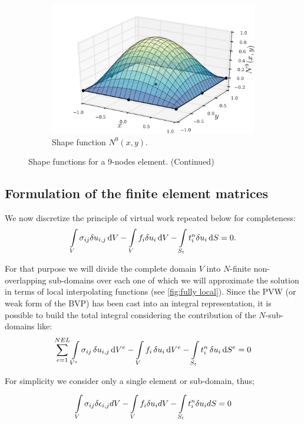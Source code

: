 \begin{figure} [H]
\begin{subfigure}[b]{0.45\textwidth}
		\includegraphics[width=\textwidth]{shape_func-9-nodes-9.pdf}
		\caption{Shape function $N^9(x,y)$.}
	\end{subfigure}
\caption{Shape functions for a 9-nodes element. (Continued)}
\end{figure}

\subsection{Formulation of the finite element matrices}
We now discretize the principle of virtual work repeated below for completeness:
\begin{equation} \label{pvw_2}
\int\limits_V \sigma_{ij} \delta u_{i,j} \dd{V} - \int\limits_V f_i \delta u_i \dd{V} - \int\limits_{S_t} t_i^n \delta u_i \dd{S} = 0.
\end{equation}

For that purpose we will divide the complete domain $V$ into $N$-finite non-overlapping sub-domains over each one of which we will approximate the solution in terms of local interpolating functions (see \cref{fig:fully local}). Since the PVW (or weak form of the BVP) has been cast into an integral representation, it is possible to build the total integral considering the contribution of the $N$-sub-domains like:
\begin{equation}\label{pvw_dis}
\sum_{e=1}^{NEL} \int\limits_{V^e} \sigma_{ij} \var{u}_{i,j} \dd{V^e} - \int\limits_V f_i \var{u}_i \dd{V^e} - \int\limits_{S_t} t_i^n \var{u}_i\dd{S^e} = 0 
\end{equation}

For simplicity we consider only a single element or sub-domain, thus;

\begin{equation}\label{pvw_sing}
\int\limits_V \sigma_{ij} \delta\epsilon_{i,j} dV - \int\limits_V f_i\delta u_idV - \int\limits_{S_t} t_i^n \delta u_i dS = 0
\end{equation}

